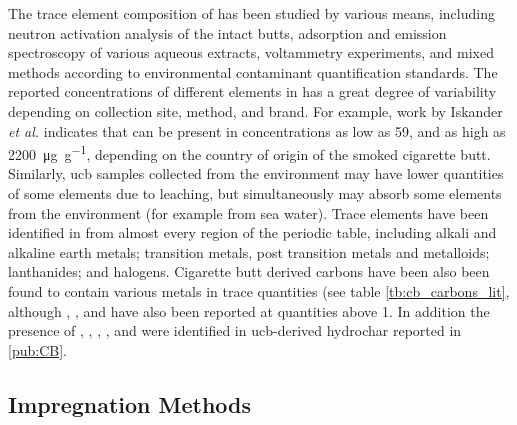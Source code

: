 The trace element composition of  has been studied by various means, including neutron activation analysis of the intact butts,\citep{iskander1992multielement, Iskander1985, jenkins1985neutron, Wu1997} \gls{adsorption} and emission spectroscopy of various aqueous extracts,\citep{MussaloRauhamaa1986, Kazi2009, Moriwaki2009, Moerman2011, Pelit2013, Dobaradaran2018} voltammetry experiments,\citep{Nitsch1991, Kalcher1993} and mixed methods according to environmental contaminant quantification standards.\citep{cardoso2018exposure} The reported concentrations of different elements in  has a great degree of variability depending on collection site, method, and brand. For example, work by Iskander \textit{et al.} indicates that  can be present in concentrations as low as \num{59}, and as high as \qty{2200}{\micro\gram\per\gram}, depending on the country of origin of the smoked cigarette butt. Similarly, \acrshort{ucb} samples collected from the environment\citep{Dobaradaran2017, Moriwaki2009, Moerman2011, chevalier2018nano} may have lower quantities of some elements due to leaching, but simultaneously may absorb some elements from the environment (for example from sea water). Trace elements have been identified in  from almost every region of the periodic table, including alkali and alkaline earth metals;\cite{MussaloRauhamaa1986, Iskander1985, iskander1992multielement, jenkins1985neutron, Wu1997, cardoso2018exposure}  transition metals, post transition metals and metalloids;\citep{MussaloRauhamaa1986, Dobaradaran2017, Iskander1985, jenkins1985neutron, Wu1997, Moriwaki2009, Moerman2011, Pelit2013, Dobaradaran2018, Ren2017, cardoso2018exposure, chevalier2018nano} lanthanides;\citep{iskander1992multielement} and halogens.\citep{Iskander1985, iskander1992multielement, jenkins1985neutron, Wu1997} Cigarette butt derived carbons have been also been found to contain various metals in trace quantities (see table \ref{tb:cb_carbons_lit},\citep{Soltani, Soltani2013, Yazdi2012} although , , and  have also been reported at quantities above \qty{1}{\wtpercent}.\citep{Soltani, Soltani2013, Yazdi2012, lima2018, Lee2014} In addition the presence of , , , , and  were identified in \acrshort{ucb}-derived \gls{hydrochar} reported in \ref{pub:CB}.

\subsection{Impregnation Methods}

